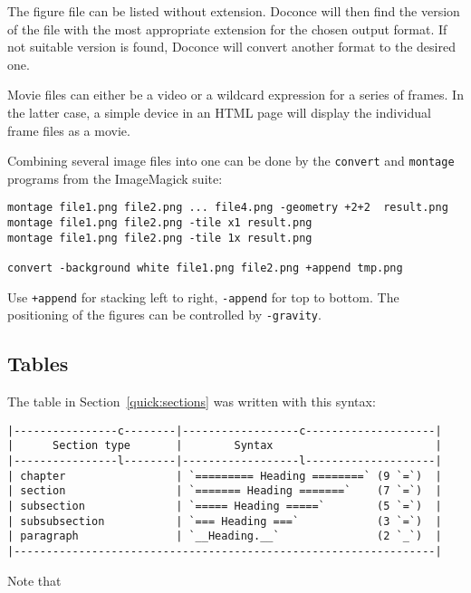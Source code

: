 \documentclass[twoside]{article}
\begin{document}
The figure file can be listed without extension. Doconce will then find
the version of the file with the most appropriate extension for the chosen
output format. If not suitable version is found, Doconce will convert
another format to the desired one.

Movie files can either be a video or a wildcard expression for a
series of frames. In the latter case, a simple device in an HTML page
will display the individual frame files as a movie.

Combining several image files into one can be done by the
{\fontsize{10pt}{10pt}\verb!convert!} and {\fontsize{10pt}{10pt}\verb!montage!} programs from the ImageMagick suite:
\begin{Verbatim}
montage file1.png file2.png ... file4.png -geometry +2+2  result.png
montage file1.png file2.png -tile x1 result.png
montage file1.png file2.png -tile 1x result.png

convert -background white file1.png file2.png +append tmp.png
\end{Verbatim}
Use {\fontsize{10pt}{10pt}\verb!+append!} for stacking left to right, {\fontsize{10pt}{10pt}\verb!-append!} for top to bottom.
The positioning of the figures can be controlled by {\fontsize{10pt}{10pt}\verb!-gravity!}.

\subsection{Tables}

The table in Section~\ref{quick:sections} was written with this
syntax:
\begin{Verbatim}
|----------------c--------|------------------c--------------------|
|      Section type       |        Syntax                         |
|----------------l--------|------------------l--------------------|
| chapter                 | `========= Heading ========` (9 `=`)  |
| section                 | `======= Heading =======`    (7 `=`)  |
| subsection              | `===== Heading =====`        (5 `=`)  |
| subsubsection           | `=== Heading ===`            (3 `=`)  |
| paragraph               | `__Heading.__`               (2 `_`)  |
|-----------------------------------------------------------------|
\end{Verbatim}

Note that
\end{document}
